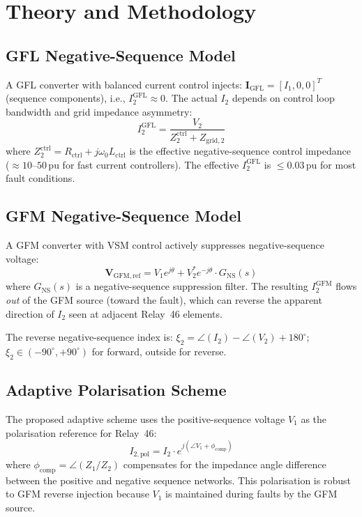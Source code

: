 \documentclass[11pt, a4paper]{article}
\newcommand{\pu}{\,\text{pu}}
\begin{document}
\section{Theory and Methodology}
\label{sec:theory}

\subsection{GFL Negative-Sequence Model}

A GFL converter with balanced current control injects:
$\mathbf{I}_{\mathrm{GFL}} = [I_1, 0, 0]^T$ (sequence components),
i.e., $I_2^{\mathrm{GFL}} \approx 0$.
The actual $I_2$ depends on control loop bandwidth and grid impedance asymmetry:
\begin{equation}
  I_2^{\mathrm{GFL}} = \frac{V_2}{Z_2^{\mathrm{ctrl}} + Z_{\mathrm{grid,2}}}
  \label{eq:gfl_i2}
\end{equation}
where $Z_2^{\mathrm{ctrl}} = R_{\mathrm{ctrl}} + j\omega_0 L_{\mathrm{ctrl}}$
is the effective negative-sequence control impedance ($\approx 10$--$50\pu$
for fast current controllers). The effective $I_2^{\mathrm{GFL}}$ is
$\leq 0.03\pu$ for most fault conditions.

\subsection{GFM Negative-Sequence Model}

A GFM converter with VSM control actively suppresses negative-sequence voltage:
\begin{equation}
  \mathbf{V}_{\mathrm{GFM,ref}} = V_1 e^{j\theta} + V_2^* e^{-j\theta}
    \cdot G_{\mathrm{NS}}(s)
  \label{eq:gfm_ns}
\end{equation}
where $G_{\mathrm{NS}}(s)$ is a negative-sequence suppression filter.
The resulting $I_2^{\mathrm{GFM}}$ flows \emph{out} of the GFM source
(toward the fault), which can reverse the apparent direction of $I_2$
seen at adjacent Relay~46 elements.

The reverse negative-sequence index is:
$\xi_2 = \angle(I_2) - \angle(V_2) + 180^\circ$;
$\xi_2 \in (-90^\circ, +90^\circ)$ for forward, outside for reverse.

\subsection{Adaptive Polarisation Scheme}

The proposed adaptive scheme uses the positive-sequence voltage $V_1$ as
the polarisation reference for Relay~46:
\begin{equation}
  I_{2,\mathrm{pol}} = I_2 \cdot e^{j(\angle V_1 + \phi_{\mathrm{comp}})}
  \label{eq:pol}
\end{equation}
where $\phi_{\mathrm{comp}} = \angle(Z_1/Z_2)$ compensates for the
impedance angle difference between the positive and negative sequence networks.
This polarisation is robust to GFM reverse injection because $V_1$ is
maintained during faults by the GFM source.
\end{document}
